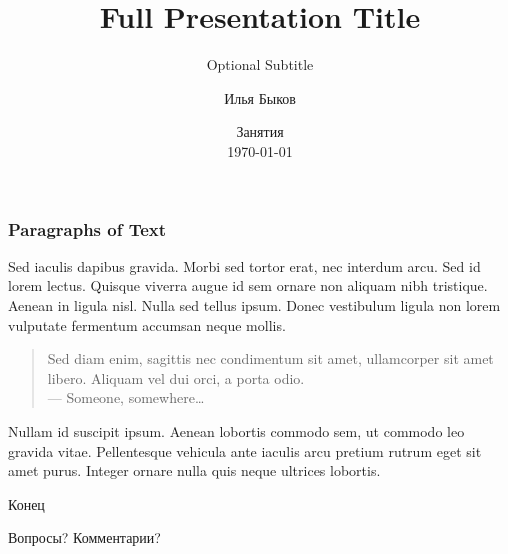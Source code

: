 \documentclass{beamer}
\title{Full Presentation Title} Заголовок
\subtitle{Optional Subtitle} %
\author{Илья Быков}
\institute{Санкт-Петербургский государственный университет} \\ \smallskip \textit{i.bykov@spbu.ru}} %
\date{Занятия \\ \today} %
\begin{document}

\begin{frame}
	\titlepage %
\end{frame}


\begin{frame}
	\frametitle{Paragraphs of Text}
	
	Sed iaculis \alert{dapibus gravida}. Morbi sed tortor erat, nec interdum arcu. Sed id lorem lectus. Quisque viverra augue id sem ornare non aliquam nibh tristique. Aenean in ligula nisl. Nulla sed tellus ipsum. Donec vestibulum ligula non lorem vulputate fermentum accumsan neque mollis.
	
	\bigskip %
	
	\begin{quote}
		Sed diam enim, sagittis nec condimentum sit amet, ullamcorper sit amet libero. Aliquam vel dui orci, a porta odio.\\
		--- Someone, somewhere\ldots
	\end{quote}
	
	\bigskip %
	
	Nullam id suscipit ipsum. Aenean lobortis commodo sem, ut commodo leo gravida vitae. Pellentesque vehicula ante iaculis arcu pretium rutrum eget sit amet purus. Integer ornare nulla quis neque ultrices lobortis.
\end{frame}


\begin{frame}[plain] %
	\begin{center}
		{\Huge Конец}

		\bigskip\bigskip %
		
		{\LARGE Вопросы? Комментарии?}
	\end{center}
\end{frame}
\end{document}
